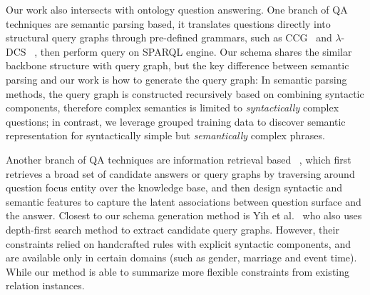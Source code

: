 


Our work also intersects with ontology question answering.%
One branch of QA techniques are semantic parsing based, it translates questions directly into structural query graphs through pre-defined grammars, such as CCG~
\cite{kwiatkowski2010inducing,cai2013large,kwiatkowski2013scaling,reddy2014large}
and $\lambda$-DCS~\cite{liang2011learning,berant2013semantic,berant2014semantic}
, then perform query on SPARQL engine.
Our schema shares the similar backbone structure with query graph, but the key difference between
semantic parsing and our work is how to generate the query graph:
In semantic parsing methods, the query graph is constructed recursively based on combining syntactic components,
therefore complex semantics is limited to \textit{syntactically} complex questions;
in contrast, we leverage grouped training data to discover semantic representation
for syntactically simple but \textit{semantically} complex phrases.

Another branch of QA techniques are information retrieval based~
\cite{yao2014information,bordes2014question,yih2015semantic},
which first retrieves a broad set of candidate answers or query graphs by traversing around
question focus entity over the knowledge base, and then design syntactic and semantic features
to capture the latent associations between question surface and the answer.
Closest to our schema generation method is Yih et al.~ who also
uses depth-first search method to extract candidate query graphs.
However, their constraints relied on handcrafted rules with explicit syntactic components, 
and are available only in certain domains (such as gender, marriage and event time).
While our method is able to summarize more flexible constraints from existing relation instances.

